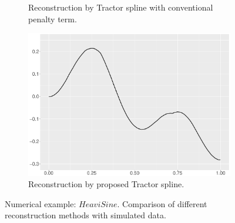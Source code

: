 \begin{figure}
\begin{subfigure}{0.45\textwidth}
    \caption{Reconstruction by Tractor spline with conventional penalty term.}
    \end{subfigure}
    \begin{subfigure}{0.45\textwidth}
    \centering
    \includegraphics[width=\linewidth,height=0.45\textwidth]{Chapters/02TractorSplineTheory/plot/ggplot/ggHeaviSineTractor.pdf}
    \caption{Reconstruction by proposed Tractor spline.}
    \end{subfigure}
\caption{Numerical example: $\textit{HeaviSine}$. Comparison of different reconstruction methods with simulated data.}\label{num3}
 \end{figure}

%
%


